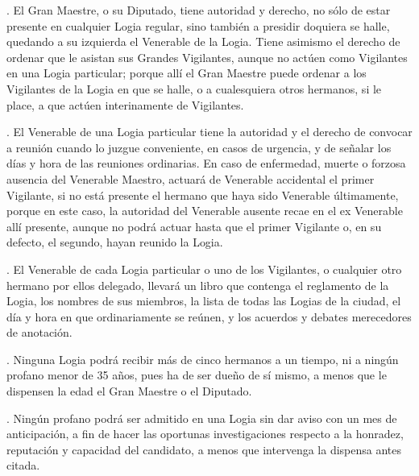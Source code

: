 \documentclass[a4paper,12pt,twoside]{book}
\begin{document}
\vspace{0.3cm}

. El Gran Maestre, o su Diputado, tiene autoridad y derecho, no sólo de estar presente en cualquier Logia regular, sino también a presidir doquiera se halle, quedando a su izquierda el Venerable de la Logia. Tiene asimismo el derecho de ordenar que le asistan sus Grandes Vigilantes, aunque no actúen como Vigilantes en una Logia particular; porque allí el Gran Maestre puede ordenar a los Vigilantes de la Logia en que se halle, o a cualesquiera otros hermanos, si le place, a que actúen interinamente de Vigilantes.

\vspace{0.3cm}

. El Venerable de una Logia particular tiene la autoridad y el derecho de convocar a reunión cuando lo juzgue conveniente, en casos de urgencia, y de señalar los días y hora de las reuniones ordinarias. En caso de enfermedad, muerte o forzosa ausencia del Venerable Maestro, actuará de Venerable accidental el primer Vigilante, si no está presente el hermano que haya sido Venerable últimamente, porque en este caso, la autoridad del Venerable ausente recae en el ex Venerable allí presente, aunque no podrá actuar hasta que el primer Vigilante o, en su defecto, el segundo, hayan reunido la Logia.

\vspace{0.3cm}

. El Venerable de cada Logia particular o uno de los Vigilantes, o cualquier otro hermano por ellos delegado, llevará un libro que contenga el reglamento de la Logia, los nombres de sus miembros, la lista de todas las Logias de la ciudad, el día y hora en que ordinariamente se reúnen, y los acuerdos y debates merecedores de anotación.

\vspace{0.3cm}

. Ninguna Logia podrá recibir más de cinco hermanos a un tiempo, ni a ningún profano menor de 35 años, pues ha de ser dueño de sí mismo, a menos que le dispensen la edad el Gran Maestre o el Diputado.

\vspace{0.3cm}

. Ningún profano podrá ser admitido en una Logia sin dar aviso con un mes de anticipación, a fin de hacer las oportunas investigaciones respecto a la honradez, reputación y capacidad del candidato, a menos que intervenga la dispensa antes citada.
\end{document}
